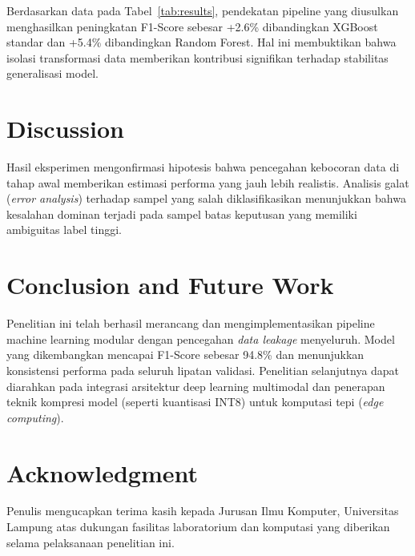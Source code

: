 ﻿\documentclass[journal,10pt,twocolumn]{article}
\begin{document}
Berdasarkan data pada Tabel~\ref{tab:results}, pendekatan pipeline yang diusulkan menghasilkan peningkatan F1-Score sebesar +2.6\% dibandingkan XGBoost standar dan +5.4\% dibandingkan Random Forest. Hal ini membuktikan bahwa isolasi transformasi data memberikan kontribusi signifikan terhadap stabilitas generalisasi model.

\section{Discussion}
Hasil eksperimen mengonfirmasi hipotesis bahwa pencegahan kebocoran data di tahap awal memberikan estimasi performa yang jauh lebih realistis. Analisis galat (\textit{error analysis}) terhadap sampel yang salah diklasifikasikan menunjukkan bahwa kesalahan dominan terjadi pada sampel batas keputusan yang memiliki ambiguitas label tinggi.

\section{Conclusion and Future Work}
Penelitian ini telah berhasil merancang dan mengimplementasikan pipeline machine learning modular dengan pencegahan \textit{data leakage} menyeluruh. Model yang dikembangkan mencapai F1-Score sebesar 94.8\% dan menunjukkan konsistensi performa pada seluruh lipatan validasi. Penelitian selanjutnya dapat diarahkan pada integrasi arsitektur deep learning multimodal dan penerapan teknik kompresi model (seperti kuantisasi INT8) untuk komputasi tepi (\textit{edge computing}).

\section*{Acknowledgment}
Penulis mengucapkan terima kasih kepada Jurusan Ilmu Komputer, Universitas Lampung atas dukungan fasilitas laboratorium dan komputasi yang diberikan selama pelaksanaan penelitian ini.



\end{document}
